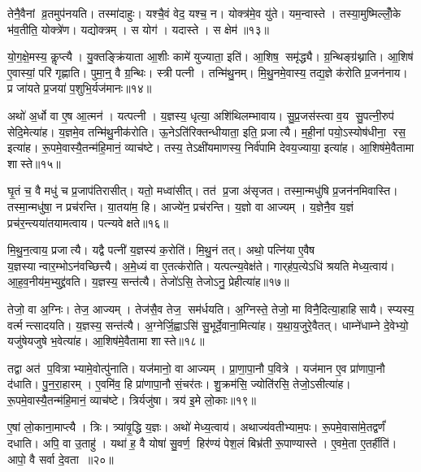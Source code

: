 तेनै॒वैनां व्र॒तमुप॑नयति।
तस्मा॑दाहुः।
यश्चै॒वं वेद॒ यश्च॒ न।
योक्त्र॑मे॒व यु॑ते।
यम॒न्वास्ते।
तस्या॒मुष्मिल्लोँ॒के भ॑व॒तीति॒ योक्त्रे॑ण।
यद्योक्त्रम्।
स योग॑।
यदास्ते।
स क्षेम॑॥१३॥

यो॒ग॒क्षे॒मस्य॒ कॢप्त्यै।
यु॒क्तङ्क्रि॑याता आ॒शीः कामे॑ युज्याता॒ इति॑।
आ॒शिष॒ समृ॑द्ध्यै।
ग्र॒न्थिङ्ग्र॑थ्नाति।
आ॒शिष॑ ए॒वास्यां॒ परि॑ गृह्णाति।
पुमा॒न्॒ वै ग्र॒न्थिः।
स्त्री पत्नी।
तन्मि॑थु॒नम्।
मि॒थु॒नमे॒वास्य॒ तद्य॒ज्ञे क॑रोति प्र॒जन॑नाय।
प्र जा॑यते प्र॒जया॑ प॒शुभि॒र्यज॑मानः॥१४॥

अथो॑ अ॒र्धो वा ए॒ष आ॒त्मन॑।
यत्पत्नी।
य॒ज्ञस्य॒ धृत्या॒ अशि॑थिलम्भावाय।
सु॒प्र॒जस॑स्त्वा व॒य सु॒पत्नी॒रुप॑ सेदि॒मेत्या॑ह।
य॒ज्ञमे॒व तन्मि॑थु॒नीक॑रोति।
ऊ॒नेऽति॑रिक्तन्धीयाता॒ इति॒ प्रजात्यै।
म॒ही॒नां पयो॒ऽस्योष॑धीना॒ रस॒ इत्या॑ह।
रू॒पमे॒वास्यै॒तन्म॑हि॒मानं॒ व्याच॑ष्टे।
तस्य॒ तेऽक्षी॑यमाणस्य॒ निर्व॑पामि देवय॒ज्याया॒ इत्या॑ह।
आ॒शिष॑मे॒वैतामा शास्ते॥१५॥\anuvakamend[क॒रोति॑ व्रतोप॒नय॑नं॒ क्षेमो॒ यज॑मानः शास्ते]

घृ॒तं च॒ वै मधु॑ च प्र॒जाप॑तिरासीत्।
यतो॒ मध्वा॑सीत्।
तत॑ प्र॒जा अ॑सृजत।
तस्मा॒न्मधु॑षि प्र॒जन॑नमिवास्ति।
तस्मा॒न्मधु॑षा॒ न प्रच॑रन्ति।
या॒तया॑म॒ हि।
आज्ये॑न॒ प्रच॑रन्ति।
य॒ज्ञो वा आज्यम्।
य॒ज्ञेनै॒व य॒ज्ञं प्रच॑र॒न्त्यया॑तयामत्वाय।
पत्न्यवेक्षते॥१६॥

मि॒थु॒न॒त्वाय॒ प्रजात्यै।
यद्वै पत्नी॑ य॒ज्ञस्य॑ क॒रोति॑।
मि॒थु॒नं तत्।
अथो॒ पत्नि॑या ए॒वैष य॒ज्ञस्यान्वार॒म्भोऽन॑वच्छित्त्यै।
अ॒मे॒ध्यं वा ए॒तत्क॑रोति।
यत्पत्न्य॒वेक्ष॑ते।
गार्‌ह॑प॒त्येऽधि॑ श्रयति मेध्य॒त्वाय॑।
आ॒ह॒व॒नीय॑म॒भ्युद्द्र॑वति।
य॒ज्ञस्य॒ सन्त॑त्यै।
तेजो॑ऽसि॒ तेजोऽनु॒ प्रेहीत्या॑ह॥१७॥

तेजो॒ वा अ॒ग्निः।
तेज॒ आज्यम्।
तेज॑सै॒व तेज॒ सम॑र्धयति।
अ॒ग्निस्ते॒ तेजो॒ मा विनै॒दित्या॒हाहिसायै।
स्प्यस्य॒ वर्त्मन्त्सादयति।
य॒ज्ञस्य॒ सन्त॑त्यै।
अ॒ग्नेर्जि॒ह्वाऽसि॑ सु॒भूर्दे॒वाना॒मित्या॑ह।
य॒था॒य॒जुरे॒वैतत्।
धाम्ने॑धाम्ने दे॒वेभ्यो॒ यजु॑षेयजुषे भ॒वेत्या॑ह।
आ॒शिष॑मे॒वैतामा शास्ते॥१८॥

तद्वा अत॑ प॒वित्राभ्यामे॒वोत्पु॑नाति।
यज॑मानो॒ वा आज्यम्।
प्रा॒णा॒पा॒नौ प॒वित्रे।
यज॑मान ए॒व प्रा॑णापा॒नौ द॑धाति।
पु॒न॒रा॒हारम्।
ए॒वमि॑व॒ हि प्रा॑णापा॒नौ सं॒चर॑तः।
शु॒क्रम॑सि॒ ज्योति॑रसि॒ तेजो॒ऽसीत्या॑ह।
रू॒पमे॒वास्यै॒तन्म॑हि॒मानं॒ व्याच॑ष्टे।
त्रिर्यजु॑षा।
त्रय॑ इ॒मे लो॒काः॥१९॥

ए॒षां लो॒काना॒माप्त्यै।
त्रिः।
त्र्या॑वृ॒द्धि य॒ज्ञः।
अथो॑ मेध्य॒त्वाय॑।
अथाज्य॑वतीभ्याम॒पः।
रू॒पमे॒वासा॑मे॒तद्वर्णं॑ दधाति।
अपि॒ वा उ॒ताहु॑।
यथा॑ ह॒ वै योषा॑ सु॒वर्ण॒ हिर॑ण्यं पेश॒लं बिभ्र॑ती रू॒पाण्यास्ते।
ए॒वमे॒ता ए॒तर्\mbox{}हीति॑।
आपो॒ वै सर्वा दे॒वता॥२०॥

